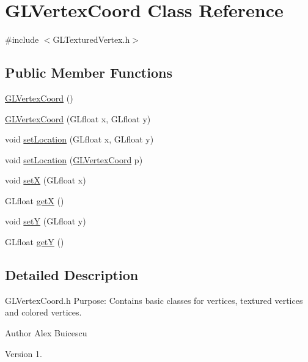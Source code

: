 \hypertarget{class_g_l_vertex_coord}{}\section{G\+L\+Vertex\+Coord Class Reference}
\label{class_g_l_vertex_coord}


{\ttfamily \#include $<$G\+L\+Textured\+Vertex.\+h$>$}

\subsection*{Public Member Functions}
\begin{DoxyCompactItemize}
\item 
\hyperlink{class_g_l_vertex_coord_ae7ecc815852acf7e4cdd354ea3f4b318}{G\+L\+Vertex\+Coord} ()
\item 
\hyperlink{class_g_l_vertex_coord_a5a0b57c3ab172762a518513a0102435a}{G\+L\+Vertex\+Coord} (G\+Lfloat x, G\+Lfloat y)
\item 
void \hyperlink{class_g_l_vertex_coord_a467932faae4d406c7aab9c15cda89869}{set\+Location} (G\+Lfloat x, G\+Lfloat y)
\item 
void \hyperlink{class_g_l_vertex_coord_a1da3b1d05a9bc18c769e8fbe0ba9e77c}{set\+Location} (\hyperlink{class_g_l_vertex_coord}{G\+L\+Vertex\+Coord} p)
\item 
void \hyperlink{class_g_l_vertex_coord_ab2c1083f1b749a14ae490cc8ff1fe268}{set\+X} (G\+Lfloat x)
\item 
G\+Lfloat \hyperlink{class_g_l_vertex_coord_a6b01701c93a27774cd4177a0541ff336}{get\+X} ()
\item 
void \hyperlink{class_g_l_vertex_coord_aaa18928c5c6cefc64c32daacb8055a40}{set\+Y} (G\+Lfloat y)
\item 
G\+Lfloat \hyperlink{class_g_l_vertex_coord_a3b052b3f16aac4b54848364446f5099d}{get\+Y} ()
\end{DoxyCompactItemize}


\subsection{Detailed Description}
G\+L\+Vertex\+Coord.\+h Purpose\+: Contains basic classes for vertices, textured vertices and colored vertices.

\begin{DoxyAuthor}{Author}
Alex Buicescu 
\end{DoxyAuthor}
\begin{DoxyVersion}{Version}
1. 
\end{DoxyVersion}



